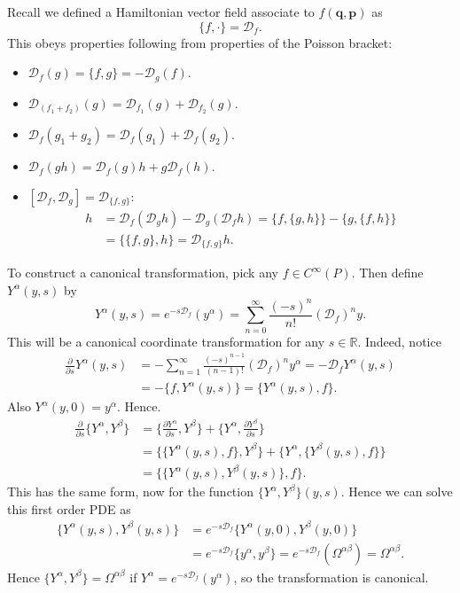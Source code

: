 \documentclass[12pt]{article}
\begin{document}
Recall we defined a Hamiltonian vector field associate to $f(\mathbf{q}, \mathbf{p})$ as
\[
	\{f, \cdot\} = \mathcal{D}_f.
\]
This obeys properties following from properties of the Poisson bracket:
\begin{itemize}
	\item $\mathcal{D}_f(g) = \{f, g\} = - \mathcal{D}_g(f)$.
	\item $\mathcal{D}_{(f_1+f_2)}(g) = \mathcal{D}_{f_1}(g) + \mathcal{D}_{f_2}(g)$.
	\item $\mathcal{D}_f(g_1+g_2) = \mathcal{D}_f(g_1) + \mathcal{D}_f(g_2)$.
	\item $\mathcal{D}_f(gh) = \mathcal{D}_f (g)h + g \mathcal{D}_f(h)$.
	\item $[\mathcal{D}_f, \mathcal{D}_g] = \mathcal{D}_{\{f, g\}}$:
		\begin{align*}
			[\mathcal{D}_f, \mathcal{D}_g] h &= \mathcal{D}_f(\mathcal{D}_g h) - \mathcal{D}_g(\mathcal{D}_f h) = \{f, \{g, h\}\} - \{g, \{f, h\}\} \\
							 &= \{\{f, g\}, h\} = \mathcal{D}_{\{f, g\}} h.
		\end{align*}
\end{itemize}
To construct a canonical transformation, pick any $f \in C^{\infty}(P)$. Then define $Y^{\alpha}(y, s)$ by
\[
Y^{\alpha}(y, s) = e^{-s \mathcal{D}_f}(y^{\alpha}) = \sum_{n = 0}^{\infty} \frac{(-s)^n}{n!} (\mathcal{D}_f)^n y.
\]
This will be a canonical coordinate transformation for any $s \in \mathbb{R}$. Indeed, notice
\begin{align*}
	\frac{\partial}{\partial s} Y^{\alpha}(y, s) &= - \sum_{n = 1}^{\infty} \frac{(-s)^{n-1}}{(n-1)!} (\mathcal{D}_f)^{n} y^{\alpha} = - \mathcal{D}_f Y^{\alpha}(y, s) \\
						     &= - \{f, Y^{\alpha}(y, s)\} = \{Y^{\alpha}(y, s), f\}.
\end{align*}
Also $Y^{\alpha}(y, 0) = y^{\alpha}$. Hence.
\begin{align*}
	\frac{\partial}{\partial s} \{Y^\alpha, Y^\beta\} &= \biggl\{ \frac{\partial Y^{\alpha}}{\partial s}, Y^\beta \biggr\} + \biggl\{ Y^\alpha, \frac{\partial Y^\beta}{\partial s} \biggr\} \\
							  &= \{\{Y^\alpha(y, s), f\}, Y^\beta\} + \{Y^\alpha, \{Y^\beta(y, s), f\}\} \\
							  &= \{\{Y^\alpha(y, s), Y^\beta(y, s)\}, f\}.
\end{align*}
This has the same form, now for the function $\{Y^\alpha, Y^\beta\}(y, s)$. Hence we can solve this first order PDE as
\begin{align*}
	\{Y^\alpha(y, s), Y^\beta(y, s)\} &= e^{-s \mathcal{D}_f}\{Y^\alpha(y, 0), Y^\beta(y, 0)\} \\
					  &= e^{-s \mathcal{D}_f} \{y^\alpha, y^\beta\} = e^{-s \mathcal{D}_f}(\Omega^{\alpha\beta}) = \Omega^{\alpha\beta}.
\end{align*}
Hence $\{Y^\alpha, Y^\beta\} = \Omega^{\alpha\beta}$ if $Y^\alpha = e^{-s \mathcal{D}_f}(y^\alpha)$, so the transformation is canonical.
\end{document}
